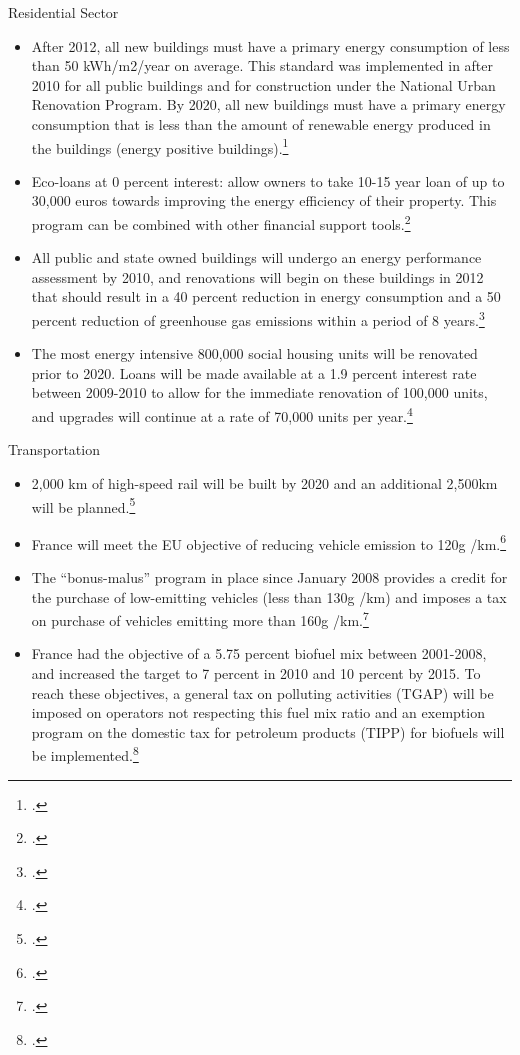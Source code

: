 Residential Sector
\begin{itemize}
	\item After 2012, all new buildings must have a primary energy consumption of less than 50 kWh/m2/year on average. This standard was implemented in after 2010 for all public buildings and for construction under the National Urban Renovation Program. By 2020, all new buildings must have a primary energy consumption that is less than the amount of renewable energy produced in the buildings (energy positive buildings).\footcite[][]{GrenellePolicies}
	\item Eco-loans at 0 percent interest: allow owners to take 10-15 year loan of up to 30,000 euros towards improving the energy efficiency of their property. This program can be combined with other financial support tools.\footcite[][]{GrenellePolicies}
	\item All public and state owned buildings will undergo an energy performance assessment by 2010,  and renovations will begin on these buildings in 2012 that should result in a 40 percent reduction in energy consumption and a 50 percent reduction of greenhouse gas emissions within a period of 8 years.\footcite[][]{GrenellePolicies}
	\item The most energy intensive 800,000 social housing units will be renovated prior to 2020. Loans will be made available at a 1.9 percent interest rate between 2009-2010 to allow for the immediate renovation of 100,000 units, and upgrades will continue at a rate of 70,000 units per year.\footcite[][]{GrenellePolicies}
\end{itemize}



Transportation
\begin{itemize}
	\item 2,000 km of high-speed rail will be built by 2020 and an additional 2,500km will be planned.\footcite[][]{GrenellePolicies}
	\item France will meet the EU objective of reducing vehicle emission to 120g /km.\footcite[][]{GrenellePolicies}
	\item The “bonus-malus” program in place since January 2008 provides a credit for the purchase of low-emitting vehicles  (less than 130g /km) and imposes a tax on purchase of vehicles emitting more than 160g /km.\footcite[][]{GrenellePolicies}
	\item France had the objective of a 5.75 percent biofuel mix between 2001-2008, and increased the target to 7 percent in 2010 and 10 percent by 2015. To reach these objectives, a general tax on polluting activities (TGAP) will be imposed on operators not respecting this fuel mix ratio and an exemption program on the domestic tax for petroleum products (TIPP) for biofuels will be implemented.\footcite[][]{GrenellePolicies}
\end{itemize}



